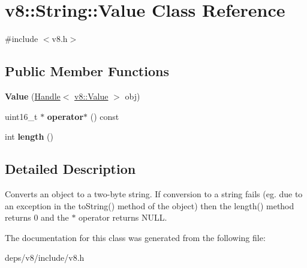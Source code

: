 \hypertarget{classv8_1_1_string_1_1_value}{}\section{v8\+:\+:String\+:\+:Value Class Reference}
\label{classv8_1_1_string_1_1_value}


{\ttfamily \#include $<$v8.\+h$>$}

\subsection*{Public Member Functions}
\begin{DoxyCompactItemize}
\item 
\hypertarget{classv8_1_1_string_1_1_value_a9d6a6d258196a0a34ac257b2abaf659a}{}{\bfseries Value} (\hyperlink{classv8_1_1_handle}{Handle}$<$ \hyperlink{classv8_1_1_value}{v8\+::\+Value} $>$ obj)\label{classv8_1_1_string_1_1_value_a9d6a6d258196a0a34ac257b2abaf659a}

\item 
\hypertarget{classv8_1_1_string_1_1_value_aee57b84e53366f272948e8c241070411}{}uint16\+\_\+t $\ast$ {\bfseries operator$\ast$} () const \label{classv8_1_1_string_1_1_value_aee57b84e53366f272948e8c241070411}

\item 
\hypertarget{classv8_1_1_string_1_1_value_ab363c59b1ac4d1b59a55e5a32a2e9f17}{}int {\bfseries length} ()\label{classv8_1_1_string_1_1_value_ab363c59b1ac4d1b59a55e5a32a2e9f17}

\end{DoxyCompactItemize}


\subsection{Detailed Description}
Converts an object to a two-\/byte string. If conversion to a string fails (eg. due to an exception in the to\+String() method of the object) then the length() method returns 0 and the $\ast$ operator returns N\+U\+L\+L. 

The documentation for this class was generated from the following file\+:\begin{DoxyCompactItemize}
\item 
deps/v8/include/v8.\+h\end{DoxyCompactItemize}
